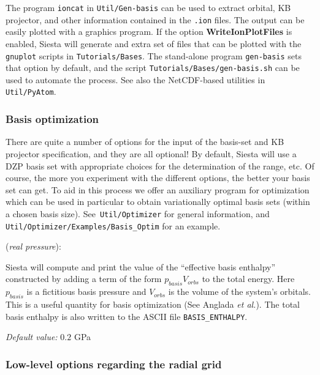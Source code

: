 \documentclass[11pt]{article}
\begin{document}
The program {\tt ioncat} in {\tt Util/Gen-basis} can be used to
extract orbital, KB projector, and other information contained in the
{\tt .ion} files. The output can be easily plotted with a graphics
program.  If the option {\bf WriteIonPlotFiles} is enabled, {\sc
  Siesta} will generate and extra set of files that can be plotted
with the {\tt gnuplot} scripts in {\tt Tutorials/Bases}.
The stand-alone program {\tt gen-basis} sets that option by default, and
the script {\tt Tutorials/Bases/gen-basis.sh} can be used to automate
the process. See also the NetCDF-based utilities in {\tt
  Util/PyAtom}.

\subsubsection{Basis optimization}

There are quite a number of options for the input of the basis-set and
KB projector specification, and they are all optional! By default,
{\sc Siesta} will use a DZP basis set with appropriate choices for the
determination of the range, etc. Of course, the more you experiment
with the different options, the better your basis set can get. To aid
in this process we offer an auxiliary program for optimization which
can be used in particular to obtain variationally optimal basis sets
(within a chosen basis size). See {\tt Util/Optimizer}
for general information, and {\tt Util/Optimizer/Examples/Basis\_Optim}
for an example.

\begin{description}
\itemsep 10pt
\parsep 0pt
\item[{\bf BasisPressure}] ({\it real pressure}):

{\sc Siesta} will compute and print the value of the ``effective basis
enthalpy'' constructed by adding a term of the form
$p_{basis}V_{orbs}$ to the total energy. Here $p_{basis}$ is a
fictitious basis pressure and $V_{orbs}$ is the volume of the system's
orbitals. This is a useful quantity for basis optimization (See
Anglada {\it et al.\/}). The total basis enthalpy is also written to
the ASCII file {\tt BASIS\_ENTHALPY}.

{\it Default value:} { $0.2$ GPa}

\end{description}

\subsubsection{Low-level options regarding the radial grid}
\end{document}
